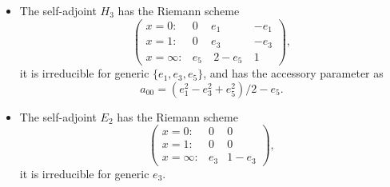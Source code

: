 \documentclass[a4paper,12pt]{article}
\theoremstyle{definition}
\theoremstyle{remark}
\numberwithin{equation}{section} %
\begin{document}
\begin {itemize}
\item  The self-adjoint $H_3$ has the Riemann scheme 
\[\left(\begin{array}{cccc}
 x=0:&0&e_1&-e_1\\ x=1:& 0&e_3&-e_3\\  x=\infty:&e_5&\ 2-e_5\ &1\end{array}\right),\]
it is irreducible for generic $\{e_1,e_3,e_5\}$, and has the accessory parameter as
$$a_{00}=(e_1^2 - e_3^2 + e_5^2)/2 - e_5.$$

\item The self-adjoint $E_2$ has the Riemann scheme 
\[\left(\begin{array}{ccc}
 x=0:&0&0\\  x=1:&0&0\\  x=\infty:&e_3&1-e_3\end{array}\right),\]
it is irreducible for generic $e_3$.
\end{itemize}
\end{document}
